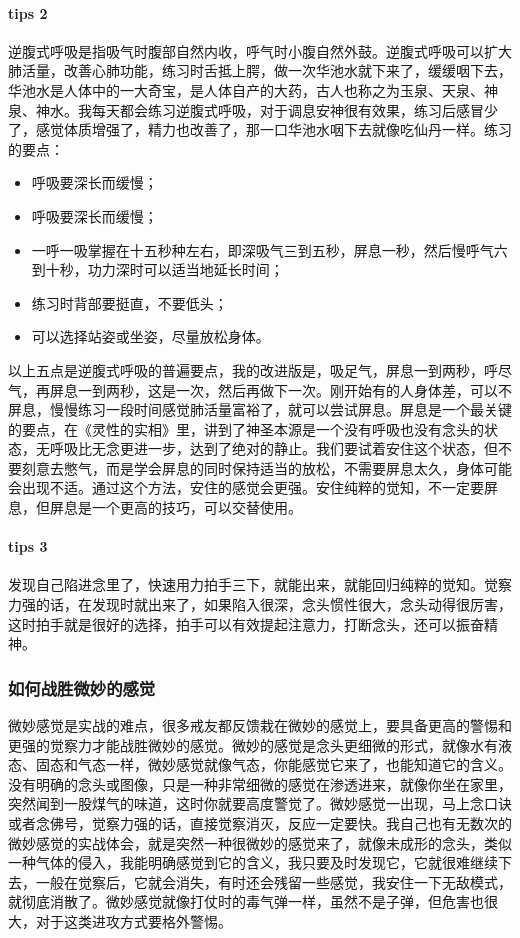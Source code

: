 \paragraph{tips 2} 逆腹式呼吸是指吸气时腹部自然内收，呼气时小腹自然外鼓。逆腹式呼吸可以扩大肺活量，改善心肺功能，练习时舌抵上腭，做一次华池水就下来了，缓缓咽下去，华池水是人体中的一大奇宝，是人体自产的大药，古人也称之为玉泉、天泉、神泉、神水。我每天都会练习逆腹式呼吸，对于调息安神很有效果，练习后感冒少了，感觉体质增强了，精力也改善了，那一口华池水咽下去就像吃仙丹一样。练习的要点：\begin{itemize}
    \item 呼吸要深长而缓慢；
    \item 呼吸要深长而缓慢；
    \item 一呼一吸掌握在十五秒种左右，即深吸气三到五秒，屏息一秒，然后慢呼气六到十秒，功力深时可以适当地延长时间；
    \item 练习时背部要挺直，不要低头；
    \item 可以选择站姿或坐姿，尽量放松身体。
\end{itemize} 以上五点是逆腹式呼吸的普遍要点，我的改进版是，吸足气，屏息一到两秒，呼尽气，再屏息一到两秒，这是一次，然后再做下一次。刚开始有的人身体差，可以不屏息，慢慢练习一段时间感觉肺活量富裕了，就可以尝试屏息。屏息是一个最关键的要点，在《灵性的实相》里，讲到了神圣本源是一个没有呼吸也没有念头的状态，无呼吸比无念更进一步，达到了绝对的静止。我们要试着安住这个状态，但不要刻意去憋气，而是学会屏息的同时保持适当的放松，不需要屏息太久，身体可能会出现不适。通过这个方法，安住的感觉会更强。安住纯粹的觉知，不一定要屏息，但屏息是一个更高的技巧，可以交替使用。

\paragraph{tips 3} 发现自己陷进念里了，快速用力拍手三下，就能出来，就能回归纯粹的觉知。觉察力强的话，在发现时就出来了，如果陷入很深，念头惯性很大，念头动得很厉害，这时拍手就是很好的选择，拍手可以有效提起注意力，打断念头，还可以振奋精神。

\subsubsection{如何战胜微妙的感觉}

微妙感觉是实战的难点，很多戒友都反馈栽在微妙的感觉上，要具备更高的警惕和更强的觉察力才能战胜微妙的感觉。微妙的感觉是念头更细微的形式，就像水有液态、固态和气态一样，微妙感觉就像气态，你能感觉它来了，也能知道它的含义。没有明确的念头或图像，只是一种非常细微的感觉在渗透进来，就像你坐在家里，突然闻到一股煤气的味道，这时你就要高度警觉了。微妙感觉一出现，马上念口诀或者念佛号，觉察力强的话，直接觉察消灭，反应一定要快。我自己也有无数次的微妙感觉的实战体会，就是突然一种很微妙的感觉来了，就像未成形的念头，类似一种气体的侵入，我能明确感觉到它的含义，我只要及时发现它，它就很难继续下去，一般在觉察后，它就会消失，有时还会残留一些感觉，我安住一下无敌模式，就彻底消散了。微妙感觉就像打仗时的毒气弹一样，虽然不是子弹，但危害也很大，对于这类进攻方式要格外警惕。

